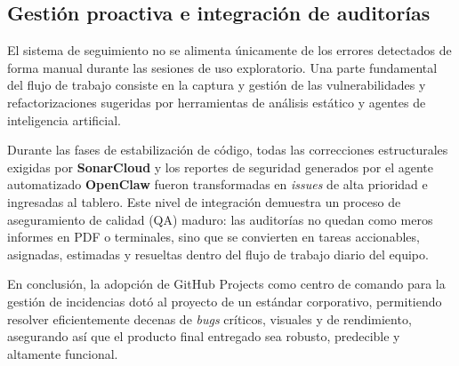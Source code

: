 \subsection{Gestión proactiva e integración de auditorías}

El sistema de seguimiento no se alimenta únicamente de los errores detectados de forma manual durante las sesiones de uso exploratorio. Una parte fundamental del flujo de trabajo consiste en la captura y gestión de las vulnerabilidades y refactorizaciones sugeridas por herramientas de análisis estático y agentes de inteligencia artificial.

Durante las fases de estabilización de código, todas las correcciones estructurales exigidas por \textbf{SonarCloud} y los reportes de seguridad generados por el agente automatizado \textbf{OpenClaw} fueron transformadas en \textit{issues} de alta prioridad e ingresadas al tablero. Este nivel de integración demuestra un proceso de aseguramiento de calidad (QA) maduro: las auditorías no quedan como meros informes en PDF o terminales, sino que se convierten en tareas accionables, asignadas, estimadas y resueltas dentro del flujo de trabajo diario del equipo.

En conclusión, la adopción de GitHub Projects como centro de comando para la gestión de incidencias dotó al proyecto de un estándar corporativo, permitiendo resolver eficientemente decenas de \textit{bugs} críticos, visuales y de rendimiento, asegurando así que el producto final entregado sea robusto, predecible y altamente funcional.
